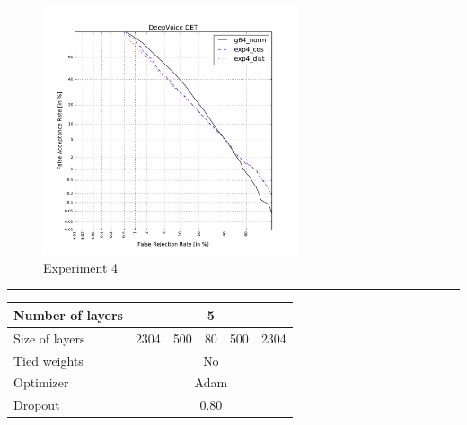 \documentclass[conference]{IEEEtran}
\begin{document}
\begin{figure}[!h]
    \centering
    \includegraphics[width=7.5cm]{../scores/det4.pdf}
    \captionsetup{labelformat=empty}
    \caption{Experiment 4}
\end{figure}

\hrule
\vspace{0.5cm}







\begin{table}[!h]
\centering
\begin{tabular}{|l|c|c|c|c|c|}
\hline
Number of layers & \multicolumn{5}{c|}{5}                \\ \hline
Size of layers   & 2304   & 500   & 80  & 500  & 2304   \\ \hline
Tied weights     & \multicolumn{5}{c|}{No}               \\ \hline
Optimizer        & \multicolumn{5}{c|}{Adam} \\ \hline
Dropout          & \multicolumn{5}{c|}{0.80} \\ \hline
\end{tabular}
\end{table}
\end{document}
